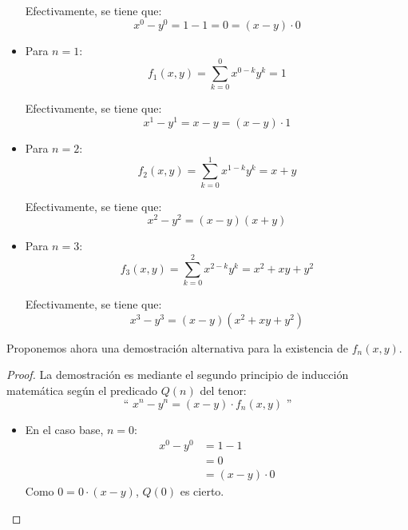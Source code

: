 \begin{ejercicio}
\begin{itemize}
                Efectivamente, se tiene que:
                \begin{equation*}
                    x^0 - y^0 = 1 - 1 = 0 = (x-y)\cdot 0
                \end{equation*}
            \item Para $n=1$:
                \begin{equation*}
                    f_1(x, y) = \sum_{k=0}^{0}x^{0-k}y^k = 1
                \end{equation*}

                Efectivamente, se tiene que:
                \begin{equation*}
                    x^1 - y^1 = x - y = (x-y)\cdot 1
                \end{equation*}
            \item Para $n=2$:
                \begin{equation*}
                    f_2(x, y) = \sum_{k=0}^{1}x^{1-k}y^k = x + y
                \end{equation*}

                Efectivamente, se tiene que:
                \begin{equation*}
                    x^2 - y^2 = (x-y)(x+y)
                \end{equation*}
            \item Para $n=3$:
                \begin{equation*}
                    f_3(x, y) = \sum_{k=0}^{2}x^{2-k}y^k = x^2 + xy + y^2
                \end{equation*}

                Efectivamente, se tiene que:
                \begin{equation*}
                    x^3 - y^3 = (x-y)(x^2 + xy + y^2)
                \end{equation*}
        \end{itemize}\newpage

        \begin{observacion}
            Proponemos ahora una demostración alternativa para la existencia de $f_n(x, y)$.
            \begin{proof}
            La demostración es mediante el segundo principio de inducción matemática
            según el predicado $Q(n)$ del tenor:
            \begin{equation*}
                \text{`` }x^n - y^n = (x-y)\cdot f_n(x, y)\text{ ''}
            \end{equation*}
            \begin{itemize}
                \item En el caso base, $n=0$:
                    \begin{align*}
                        x^0 - y^0 &= 1 - 1 \\&= 0 \\&= (x-y)\cdot 0
                    \end{align*}
                    Como $0 = 0\cdot (x-y)$, $Q(0)$ es cierto.


\end{itemize}
\end{proof}
\end{observacion}
\end{ejercicio}
